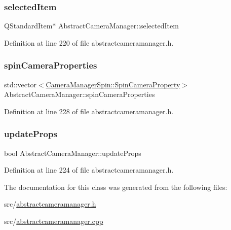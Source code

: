 \subsubsection{\texorpdfstring{selectedItem}{selectedItem}}
{\footnotesize\ttfamily Q\+Standard\+Item$\ast$ Abstract\+Camera\+Manager\+::selected\+Item\hspace{0.3cm}{\ttfamily [protected]}}



Definition at line 220 of file abstractcameramanager.\+h.

\mbox{\label{class_abstract_camera_manager_a259e5562b28f304fa3d84c4b85bead45}} 
\subsubsection{\texorpdfstring{spinCameraProperties}{spinCameraProperties}}
{\footnotesize\ttfamily std\+::vector$<$\mbox{\hyperlink{class_camera_manager_spin_1_1_spin_camera_property}{Camera\+Manager\+Spin\+::\+Spin\+Camera\+Property}}$>$ Abstract\+Camera\+Manager\+::spin\+Camera\+Properties\hspace{0.3cm}{\ttfamily [protected]}}



Definition at line 228 of file abstractcameramanager.\+h.

\mbox{\label{class_abstract_camera_manager_a204492d1767bbf1c6cdfa7b145c41429}} 
\subsubsection{\texorpdfstring{updateProps}{updateProps}}
{\footnotesize\ttfamily bool Abstract\+Camera\+Manager\+::update\+Props\hspace{0.3cm}{\ttfamily [protected]}}



Definition at line 224 of file abstractcameramanager.\+h.



The documentation for this class was generated from the following files\+:\begin{DoxyCompactItemize}
\item 
src/\mbox{\hyperlink{abstractcameramanager_8h}{abstractcameramanager.\+h}}\item 
src/\mbox{\hyperlink{abstractcameramanager_8cpp}{abstractcameramanager.\+cpp}}\end{DoxyCompactItemize}
